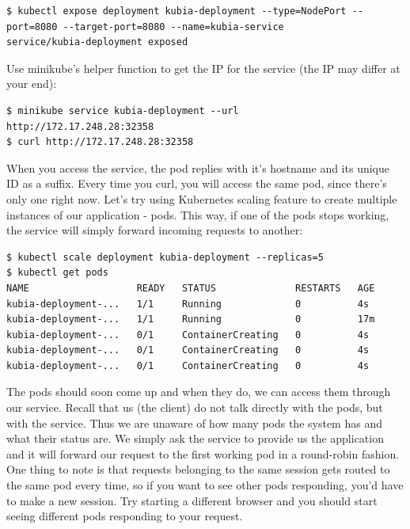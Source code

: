 \documentclass[a4paper,10pt]{article}
\begin{document}
\begin{lstlisting}[numbers=none, basicstyle=\ttfamily]
$ kubectl expose deployment kubia-deployment --type=NodePort --port=8080 --target-port=8080 --name=kubia-service
service/kubia-deployment exposed
\end{lstlisting}

Use minikube's helper function to get the IP for the service (the IP may differ at your end):

\begin{lstlisting}[numbers=none, basicstyle=\ttfamily]
$ minikube service kubia-deployment --url
http://172.17.248.28:32358
$ curl http://172.17.248.28:32358
\end{lstlisting}

When you access the service, the pod replies with it's hostname and its unique ID as a suffix. Every time you curl, you will access the same pod, since there's only one right now. Let's try using Kubernetes scaling feature to create multiple instances of our application - pods. This way, if one of the pods stops working, the service will simply forward incoming requests to another:

\newpage

\begin{lstlisting}[numbers=none, basicstyle=\ttfamily]
$ kubectl scale deployment kubia-deployment --replicas=5
$ kubectl get pods
NAME                   READY   STATUS              RESTARTS   AGE
kubia-deployment-...   1/1     Running             0          4s
kubia-deployment-...   1/1     Running             0          17m
kubia-deployment-...   0/1     ContainerCreating   0          4s
kubia-deployment-...   0/1     ContainerCreating   0          4s
kubia-deployment-...   0/1     ContainerCreating   0          4s
\end{lstlisting}

The pods should soon come up and when they do, we can access them through our service. Recall that us (the client) do not talk directly with the pods, but with the service. Thus we are unaware of how many pods the system has and what their status are. We simply ask the service to provide us the application and it will forward our request to the first working pod in a round-robin fashion. One thing to note is that requests belonging to the same session gets routed to the same pod every time, so if you want to see other pods responding, you'd have to make a new session. Try starting a different browser and you should start seeing different pods responding to your request. 
\end{document}
